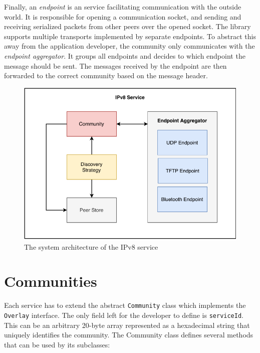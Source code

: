 Finally, an \textit{endpoint} is an service facilitating communication with the outside world. It is responsible for opening a communication socket, and sending and receiving serialized packets from other peers over the opened socket. %
The library supports multiple transports implemented by separate endpoints. To abstract this away from the application developer, the community only communicates with the \textit{endpoint aggregator}. It groups all endpoints and decides to which endpoint the message should be sent. The messages received by the endpoint are then forwarded to the correct community based on the message header.

\begin{figure}
    \includegraphics[width=\textwidth]{diagrams/ipv8-architecture}
    \caption{The system architecture of the IPv8 service}
    \label{ipv8_architecture}
\end{figure}

\section{Communities}

Each service has to extend the abstract \texttt{Community} class which implements the \texttt{Overlay} interface. The only field left for the developer to define is \texttt{serviceId}. This can be an arbitrary 20-byte array represented as a hexadecimal string that uniquely identifies the community. The Community class defines several methods that can be used by its subclasses:

